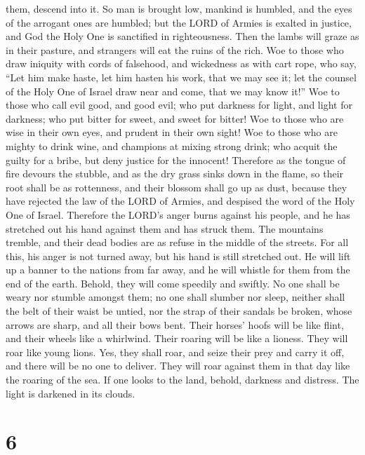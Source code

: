 them, descend into it.  So man is brought low, mankind is
humbled, and the eyes of the arrogant ones are humbled; 
but the LORD of Armies is exalted in justice, and God the Holy One is
sanctified in righteousness.  Then the lambs will graze as
in their pasture, and strangers will eat the ruins of the rich.
 Woe to those who draw iniquity with cords of falsehood,
and wickedness as with cart rope,  who say, ``Let him make
haste, let him hasten his work, that we may see it; let the counsel of
the Holy One of Israel draw near and come, that we may know it!''
 Woe to those who call evil good, and good evil; who put
darkness for light, and light for darkness; who put bitter for sweet,
and sweet for bitter!  Woe to those who are wise in their
own eyes, and prudent in their own sight!  Woe to those who
are mighty to drink wine, and champions at mixing strong drink;
 who acquit the guilty for a bribe, but deny justice for
the innocent!  Therefore as the tongue of fire devours the
stubble, and as the dry grass sinks down in the flame, so their root
shall be as rottenness, and their blossom shall go up as dust, because
they have rejected the law of the LORD of Armies, and despised the word
of the Holy One of Israel.  Therefore the LORD's anger
burns against his people, and he has stretched out his hand against them
and has struck them. The mountains tremble, and their dead bodies are as
refuse in the middle of the streets. For all this, his anger is not
turned away, but his hand is still stretched out.  He will
lift up a banner to the nations from far away, and he will whistle for
them from the end of the earth. Behold, they will come speedily and
swiftly.  No one shall be weary nor stumble amongst them;
no one shall slumber nor sleep, neither shall the belt of their waist be
untied, nor the strap of their sandals be broken,  whose
arrows are sharp, and all their bows bent. Their horses' hoofs will be
like flint, and their wheels like a whirlwind.  Their
roaring will be like a lioness. They will roar like young lions. Yes,
they shall roar, and seize their prey and carry it off, and there will
be no one to deliver.  They will roar against them in that
day like the roaring of the sea. If one looks to the land, behold,
darkness and distress. The light is darkened in its clouds.

\hypertarget{section-5}{%
\section{6}\label{section-5}}


